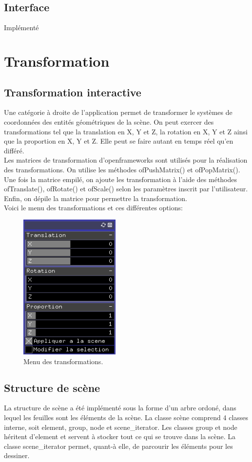 \subsection{Interface}
Implémenté

\pagebreak
\section{Transformation}
\subsection{Transformation interactive}
Une catégorie à droite de l’application permet de transformer le systèmes de coordonnées des entités géométriques de la scène. On peut exercer des transformations tel que la translation en X, Y et Z, la rotation en X, Y et Z ainsi que la proportion en X, Y et Z. Elle peut se faire autant en temps réel qu’en différé. \\

Les matrices de transformation d’openframeworks sont utilisés pour la réalisation des transformations. On utilise les méthodes ofPushMatrix() et ofPopMatrix(). Une fois la matrice empilé, on ajoute les transformation à l’aide des méthodes ofTranslate(), ofRotate() et ofScale() selon les paramètres inscrit par l’utilisateur. Enfin, on dépile la matrice pour permettre la transformation.\\

Voici le menu des transformations et ces différentes options:\\
\begin{figure}[h]
	\centering
	\includegraphics[width=5cm]{fig/transformations.png}
	\caption{Menu des transformations.}
	\label{fig:transformations}
\end{figure}

\subsection{Structure de scène}
La structure de scène a été implémenté sous la forme d'un arbre ordoné, dans lequel les feuilles sont les éléments de la scène. La classe scène comprend 4 classes interne, soit element, group, node et scene\_iterator. Les classes group et node héritent d'element et  servent à stocker tout ce qui se trouve dans la scène. La classe scene\_iterator permet, quant-à elle, de parcourir les éléments pour les dessiner. 

